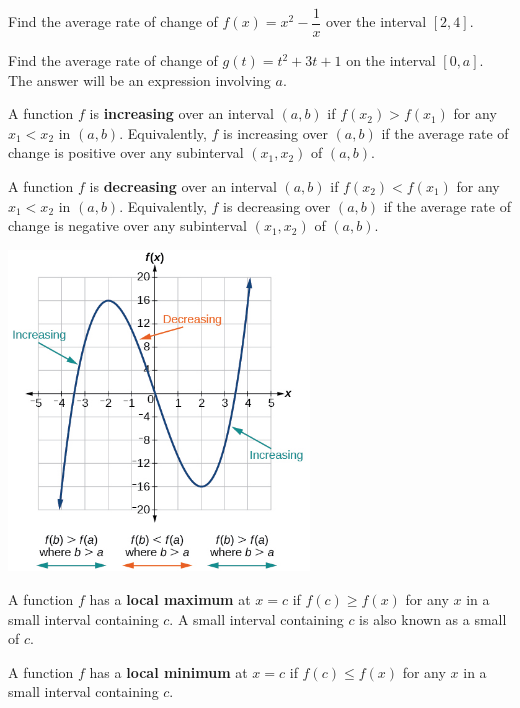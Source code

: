\begin{example}
  Find the average rate of change of $f(x)=x^2-\dfrac{1}{x}$ over the interval $[2, 4]$.
\end{example}

\newpage

\begin{example}
  Find the average rate of change of  $g(t)=t^2+3t+1$ on the interval  $[0,a]$. The answer will be an expression involving $a$.
\end{example}



\begin{definition}
  A function $f$ is \textbf{increasing} over an interval $(a, b)$ if $f(x_2)>f(x_1)$ for any $x_1<x_2$ in $(a, b)$. Equivalently, $f$ is increasing over $(a, b)$ if  the average rate of change is positive over any subinterval $(x_1, x_2)$ of $(a, b)$.
  
  A function $f$ is \textbf{decreasing} over an interval $(a, b)$ if $f(x_2)<f(x_1)$ for any $x_1<x_2$ in $(a, b)$. Equivalently, $f$ is decreasing over $(a, b)$ if  the average rate of change is negative over any subinterval $(x_1, x_2)$ of $(a, b)$.

  \begin{center}
    \includegraphics[width=0.6\textwidth]{figs/CNX_Precalc_Figure_01_03_004.jpg}
  \end{center}
\end{definition}

\newpage

\begin{definition}
  A function \(f\) has a \textbf{local maximum} at \(x=c\) if $f(c)\ge f(x)$ for any $x$ in a small interval containing $c$. A small interval containing $c$ is also known as a small  of $c$.

  A function \(f\) has a \textbf{local minimum} at \(x=c\) if $f(c)\le f(x)$ for any $x$ in a small interval containing $c$.
\end{definition}

